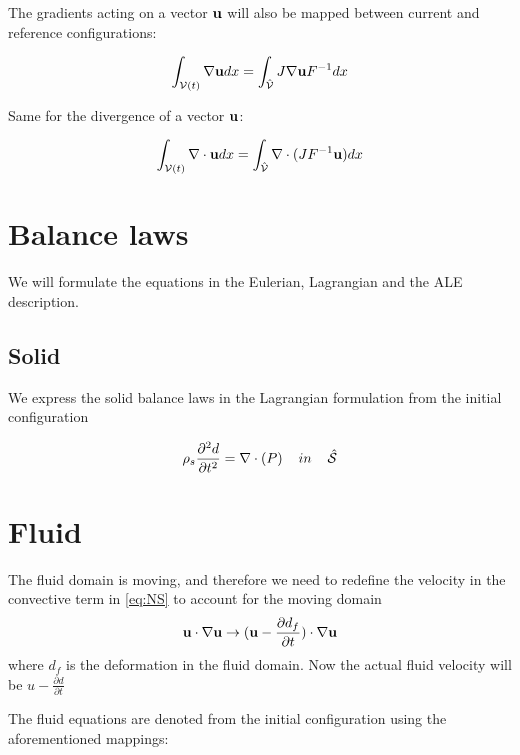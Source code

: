 The gradients acting on a vector $ \bold{u} $ will also be mapped between current and reference configurations:

\begin{equation}
\int_{\mathcal{V}(t)} \nabla \bold{u}   dx = \int_{\hat{\mathcal{V}}} J  \nabla \bold{u}F^{-1} dx  
\end{equation}

Same for the divergence of a vector $ \bold{u}$:

\begin{equation}
\int_{\mathcal{V}(t)} \nabla \cdot \bold{u}   dx = \int_{\hat{\mathcal{V}}} \nabla \cdot( J  F^{-1} \bold{u}) dx  
\end{equation}

\section*{Balance laws}

We will formulate the equations in the Eulerian, Lagrangian and the ALE description.

\subsection*{Solid}
We express the solid balance laws in the Lagrangian formulation from the initial configuration

\begin{equation}
\rho_s \frac{\partial^2 d}{\partial t^2} = \nabla \cdot (P) \hspace{4mm}in\hspace{4mm} \hat{\mathcal{S}} 
\end{equation}

\section*{Fluid}

The fluid domain is moving, and therefore we need to redefine the velocity in the convective term in \eqref{eq:NS} to account for the moving domain 
\begin{equation}
\bold{u} \cdot \nabla \bold{u} \rightarrow (\bold{u}-\frac{\partial d_f}{\partial t}) \cdot \nabla \bold{u}  
\end{equation}
where $d_f$ is the deformation in the fluid domain. Now the actual fluid velocity will be $u-\frac{\partial d}{\partial t}$ 

The fluid equations are denoted from the initial configuration using the aforementioned mappings:

